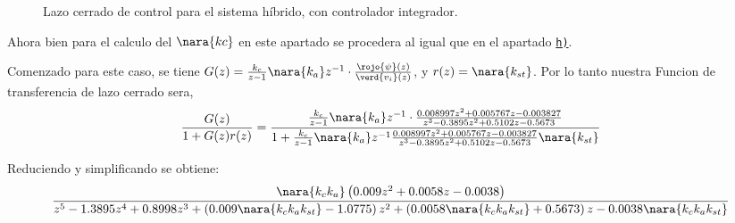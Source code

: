 \begin{figure}[h]
  \caption{Lazo cerrado de control para el sistema híbrido, con controlador integrador.}\label{fig:control-prop-hibrido}
\end{figure}



Ahora bien para el calculo del $\nara{kc}$ en este apartado se procedera al igual que en el apartado \hyperref[pregunta-h]{\texttt{h)}}.

Comenzado para este caso, se tiene $G(z) = \frac{k_{c}}{z-1}\nara{ k_{a}} z^{-1} \cdot \frac{\rojo{\psi}(z)}{\verd{v_i}(z)}$,
y $r(z) = \nara{k_{st}}$.  Por lo tanto nuestra Funcion de transferencia de lazo cerrado sera,
\begin{equation}
    \frac{G(z)}{1 + G(z)r(z)} = \dfrac{\frac{k_{c}}{z-1}\nara{k_a} z^{-1} \cdot\frac{0.008997z^2 + 0.005767 z - 0.003827}
    {z^3 - 0.3895 z^2 + 0.5102 z -0.5673}}
    {1+\frac{k_{c}}{z-1}\nara{k_a} z^{-1} \frac{0.008997z^2 + 0.005767 z - 0.003827}
    {z^3 - 0.3895 z^2 + 0.5102 z -0.5673}\nara{k_{st}}}
\end{equation}

Reduciendo y simplificando se obtiene:
\begin{equation}\label{eq:fdt-LCdi}
    \frac{ \nara{k_c k_a} \left( 0.009 z^2 + 0.0058 z - 0.0038 \right)}
    { z^5 -1.3895z^4 + 0.8998z^3 + \left( 0.009\nara{k_c k_a k_{st}}  -1.0775 \right) z^2 
    + \left(0.0058 \nara{k_c k_a k_{st}}   + 0.5673 \right) z 
    -0.0038 \nara{k_c k_a k_{st}} }
\end{equation}


